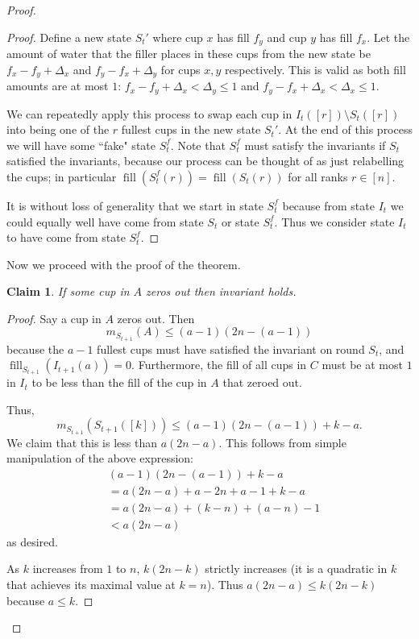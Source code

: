 \documentclass[twocolumn]{article}[10pt]
\DeclareMathOperator{\fil}{\text{fill}}
\newtheorem{clm}{Claim}
\begin{document}
\begin{proof}
\begin{proof}
Define a new state $S_t'$ where cup $x$ has fill $f_y$ and cup $y$ has fill $f_x$. 
Let the amount of water that the filler places in these cups from the new state be
$f_x-f_y+\Delta_x$ and $f_y-f_x + \Delta_y$ for cups $x,y$ respectively.
This is valid as both fill amounts are at most $1$: $f_x-f_y+\Delta_x<\Delta_y
\le 1$ and $f_y-f_x + \Delta_x < \Delta_x \le 1$.

We can repeatedly apply this process to swap each cup in $I_t([r])\setminus
S_t([r])$ into being one of the $r$ fullest cups in the new state $S_t'$.
At the end of this process we will have some ``fake" state $S_t^f$. Note that
$S_t^f$ must satisfy the invariants if $S_t$ satisfied the invariants, because
our process can be thought of as just relabelling the cups; in particular
$\fil(S_t^f(r)) = \fil(S_t(r))$ for all ranks $r \in [n]$.

It is without loss of generality that we start in state $S_t^f$ because from
state $I_t$ we could equally well have come from state $S_t$ or state $S_t^f$.
Thus we consider state $I_t$ to have come from state $S_t^f$.
\end{proof}

Now we proceed with the proof of the theorem.
\begin{clm}
  If some cup in $A$ zeros out then invariant holds.
\end{clm}
\begin{proof}
  Say a cup in $A$ zeros out. Then 
  $$m_{S_{t+1}}(A) \le (a-1)(2n-(a-1))$$
  because the $a-1$ fullest cups must have satisfied the invariant on round
  $S_t$, and $\fil_{S_{t+1}}(I_{t+1}(a)) = 0$.
  Furthermore, the fill of all cups in $C$ must be at most $1$ in $I_t$ to be
  less than the fill of the cup in $A$ that zeroed out.

  Thus, 
  $$m_{S_{t+1}}(S_{t+1}([k])) \le (a-1)(2n-(a-1))+k-a.$$
  We claim that this is less than $a(2n-a)$. 
  This follows from simple manipulation of the above expression:
  \begin{align*}
    &(a-1)(2n-(a-1))+k-a\\
    &= a(2n-a) +a -2n+a-1 + k -a\\
    &= a(2n-a) + (k-n) + (a-n) -1\\
    &< a(2n-a)
  \end{align*}
  as desired.

  As $k$ increases from $1$ to $n$, $k(2n-k)$ strictly increases (it is a
  quadratic in $k$ that achieves its maximal value at $k=n$).
  Thus $a(2n-a) \le k(2n-k)$ because $a\le k$.


\end{proof}
\end{proof}
\end{document}

